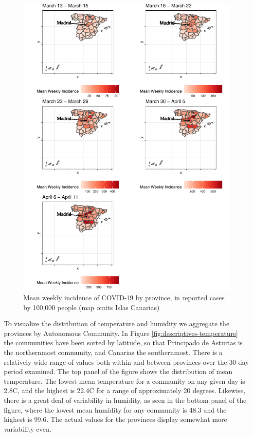 \documentclass[]{elsarticle} %
\makeatletter
\def\maxwidth{\ifdim\Gin@nat@width>\linewidth\linewidth
\else\Gin@nat@width\fi}
\let\Oldincludegraphics\includegraphics
\renewcommand{\includegraphics}[1]{\Oldincludegraphics[width=\maxwidth]{#1}}
\makeatother
\begin{document}
\begin{figure}
\centering
\includegraphics{Environmental-Correlates-of-COVID19-Spain_files/figure-latex/weekly-average-incidence-map-1.pdf}
\caption{\label{fig:weekly-average-incidence-map}Mean weekly incidence
of COVID-19 by province, in reported cases by 100,000 people (map omits
Islas Canarias)}
\end{figure}

To visualize the distribution of temperature and humidity we aggregate
the provinces by Autonomous Community. In Figure
\ref{fig:descriptives-temperature} the communities have been sorted by
latitude, so that Principado de Asturias is the northernmost community,
and Canarias the southernmost. There is a relatively wide range of
values both within and between provinces over the 30 day period
examined. The top panel of the figure shows the distribution of mean
temperature. The lowest mean temperature for a community on any given
day is 2.8C, and the highest is 22.4C for a range of approximately 20
degrees. Likewise, there is a great deal of variability in humidity, as
seen in the bottom panel of the figure, where the lowest mean humidity
for any community is 48.3 and the highest is 99.6. The actual values for
the provinces display somewhat more variability even.
\end{document}
